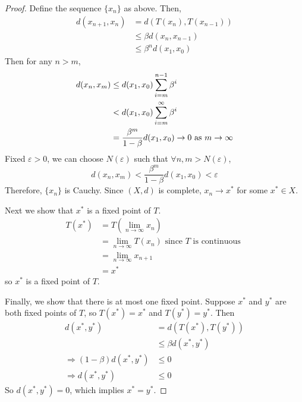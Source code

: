 \documentclass[11pt]{elegantbook}
\begin{document}
\begin{proof}
    Define the sequence $\{x_n\}$ as above. Then,
    \begin{equation}
        \begin{aligned}
            d(x_{n+1},x_n)&=d(T(x_n),T(x_{n-1}))\\
            &\leq \beta d(x_n,x_{n-1})\\
            &\leq \beta^n d(x_1,x_0)
        \end{aligned}
        \nonumber
    \end{equation}
    Then for any $n>m$,
    \begin{equation}
        \begin{aligned}
            d(x_n,x_m)&\leq d(x_1, x_0) \sum_{i=m}^{n-1}\beta^i\\
            &<d(x_1, x_0) \sum_{i=m}^{\infty}\beta^i\\
            &=\frac{\beta^m}{1-\beta}d(x_1, x_0) \rightarrow 0 \textnormal{ as }m \rightarrow \infty
        \end{aligned}
        \nonumber
    \end{equation}
    Fixed $\varepsilon>0$, we can choose $N(\varepsilon)$ such that $\forall n,m>N(\varepsilon)$, $$d(x_n,x_m)<\frac{\beta^m}{1-\beta}d(x_1, x_0) <\varepsilon$$
    Therefore, $\{x_n\}$ is Cauchy. Since $(X, d)$ is complete, $x_n \rightarrow x^*$ for some $x^*\in X$.

    Next we show that $x^*$ is a fixed point of $T$.
    $$
    \begin{aligned}
    T\left(x^*\right) & =T\left(\lim _{n \rightarrow \infty} x_n\right) \\
    & =\lim _{n \rightarrow \infty} T\left(x_n\right) \text { since } T \text { is continuous } \\
    & =\lim _{n \rightarrow \infty} x_{n+1} \\
    & =x^*
    \end{aligned}
    $$
    so $x^*$ is a fixed point of $T$.
    
    Finally, we show that there is at most one fixed point. Suppose $x^*$ and $y^*$ are both fixed points of $T$, so $T\left(x^*\right)=x^*$ and $T\left(y^*\right)=y^*$. Then
    $$
    \begin{aligned}
    d\left(x^*, y^*\right) & =d\left(T\left(x^*\right), T\left(y^*\right)\right) \\
    & \leq \beta d\left(x^*, y^*\right) \\
    \Rightarrow(1-\beta) d\left(x^*, y^*\right) & \leq 0 \\
    \Rightarrow d\left(x^*, y^*\right) & \leq 0
    \end{aligned}
    $$
    So $d\left(x^*, y^*\right)=0$, which implies $x^*=y^*$.
\end{proof}
\end{document}
